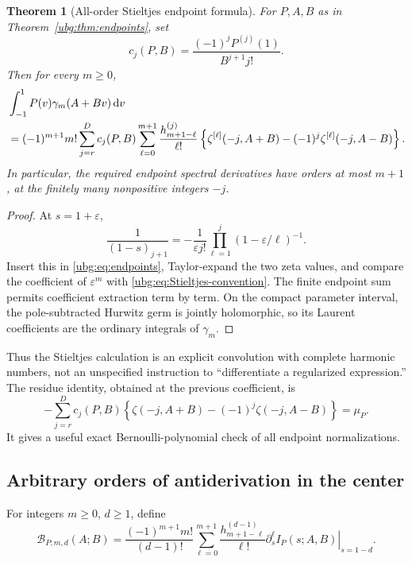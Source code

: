 \documentclass[11pt,letterpaper]{article}
\numberwithin{equation}{section}
\newtheorem{theorem}{Theorem}[section]
\theoremstyle{definition}\newtheorem{definition}[theorem]{Definition}
\theoremstyle{remark}\newtheorem{remark}[theorem]{Remark}
\newcommand{\dd}{\,\mathrm d}\newcommand{\ii}{\mathrm i}
\begin{document}
\begin{theorem}[All-order Stieltjes endpoint formula]
\label{ubg:thm:Stieltjes}
For $P,A,B$ as in Theorem~\ref{ubg:thm:endpoints}, set
\begin{equation}\label{ubg:eq:cj}
 c_j(P,B)=\frac{(-1)^jP^{(j)}(1)}{B^{j+1}j!}.
\end{equation}
Then for every $m\ge0$,
\begin{align}
 &\int_{-1}^1P(v)\gamma_m(A+Bv)\dd v\notag\\
 &=(-1)^{m+1}m!\sum_{j=r}^D c_j(P,B)
    \sum_{\ell=0}^{m+1}\frac{h_{m+1-\ell}^{(j)}}{\ell!}
     \left\{\zeta^{[\ell]}(-j,A+B)
                -(-1)^j\zeta^{[\ell]}(-j,A-B)\right\}.
 \label{ubg:eq:all-Stieltjes}
\end{align}
In particular, the required endpoint spectral derivatives have orders
at most $m+1$, at the finitely many nonpositive integers $-j$.
\end{theorem}
\begin{proof}
At $s=1+\varepsilon$,
\begin{equation}\label{ubg:eq:denominator-Stieltjes}
 \frac1{(1-s)_{j+1}}
   =-\frac1{\varepsilon j!}
                \prod_{\ell=1}^j(1-\varepsilon/\ell)^{-1}.
\end{equation}
Insert this in \eqref{ubg:eq:endpoints}, Taylor-expand the two zeta
values, and compare the coefficient of $\varepsilon^m$ with
\eqref{ubg:eq:Stieltjes-convention}. The finite endpoint sum permits
coefficient extraction term by term. On the compact parameter interval,
the pole-subtracted Hurwitz germ is jointly holomorphic, so its Laurent
coefficients are the ordinary integrals of $\gamma_m$.
\end{proof}

Thus the Stieltjes calculation is an explicit convolution with complete
harmonic numbers, not an unspecified instruction to ``differentiate a
regularized expression.'' The residue identity, obtained at the
previous coefficient, is
\begin{equation}\label{ubg:eq:residue-check}
 -\sum_{j=r}^D c_j(P,B)
       \left\{\zeta(-j,A+B)-(-1)^j\zeta(-j,A-B)\right\}
          =\mu_P.
\end{equation}
It gives a useful exact Bernoulli-polynomial check of all endpoint
normalizations.

\subsection{Arbitrary orders of antiderivation in the center}
For integers $m\ge0$, $d\ge1$, define
\begin{equation}\label{ubg:eq:Stieltjes-primitive}
 \mathcal B_{P;m,d}(A;B)=
 \frac{(-1)^{m+1}m!}{(d-1)!}
 \sum_{\ell=0}^{m+1}\frac{h_{m+1-\ell}^{(d-1)}}{\ell!}
 \left.\partial_s^\ell I_P(s;A,B)\right|_{s=1-d}.
\end{equation}
\end{document}

